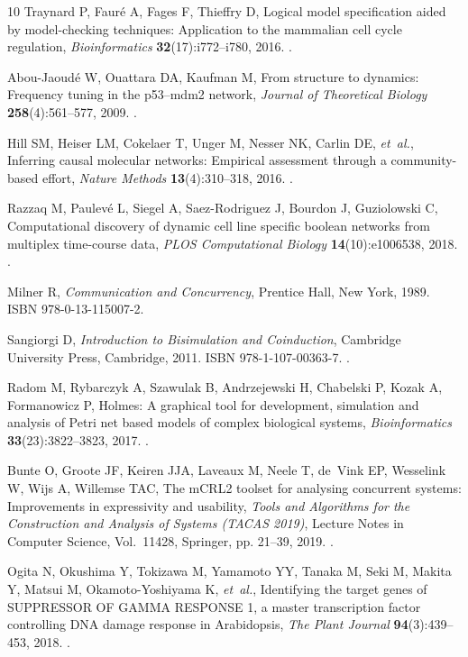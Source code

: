 \documentclass{ws-jbcb}
\numberwithin{equation}{section}
\begin{document}
\begin{thebibliography}{10}
Traynard P, Faur\'e A, Fages F, Thieffry D, Logical model specification aided
  by model-checking techniques: Application to the mammalian cell cycle
  regulation, \emph{Bioinformatics} \textbf{32}(17):i772--i780, 2016.
\newblock {}.

Abou-Jaoud\'e W, Ouattara DA, Kaufman M, From structure to dynamics: Frequency
  tuning in the p53--mdm2 network, \emph{Journal of Theoretical Biology}
  \textbf{258}(4):561--577, 2009.
\newblock {}.

Hill SM, Heiser LM, Cokelaer T, Unger M, Nesser NK, Carlin DE, \emph{et~al.},
  Inferring causal molecular networks: Empirical assessment through a
  community-based effort, \emph{Nature Methods} \textbf{13}(4):310--318, 2016.
\newblock {}.

Razzaq M, Paulev{\'e} L, Siegel A, Saez-Rodriguez J, Bourdon J, Guziolowski C,
  Computational discovery of dynamic cell line specific boolean networks from
  multiplex time-course data, \emph{PLOS Computational Biology}
  \textbf{14}(10):e1006538, 2018.
\newblock {}.

Milner R, \emph{Communication and Concurrency}, Prentice Hall, New York, 1989.
\newblock ISBN 978-0-13-115007-2.

Sangiorgi D, \emph{Introduction to Bisimulation and Coinduction}, Cambridge
  University Press, Cambridge, 2011.
\newblock ISBN 978-1-107-00363-7.
\newblock {}.

Radom M, Rybarczyk A, Szawulak B, Andrzejewski H, Chabelski P, Kozak A,
  Formanowicz P, Holmes: A graphical tool for development, simulation and
  analysis of {Petri} net based models of complex biological systems,
  \emph{Bioinformatics} \textbf{33}(23):3822--3823, 2017.
\newblock {}.

Bunte O, Groote JF, Keiren JJA, Laveaux M, Neele T, de~Vink EP, Wesselink W,
  Wijs A, Willemse TAC, The {mCRL2} toolset for analysing concurrent systems:
  Improvements in expressivity and usability,  \emph{Tools and Algorithms for
  the Construction and Analysis of Systems (TACAS 2019)}, Lecture Notes in
  Computer Science, Vol.~11428, Springer, pp. 21--39, 2019.
\newblock {}.

Ogita N, Okushima Y, Tokizawa M, Yamamoto YY, Tanaka M, Seki M, Makita Y,
  Matsui M, Okamoto-Yoshiyama K, \emph{et~al.}, Identifying the target genes of
  {SUPPRESSOR OF GAMMA RESPONSE 1}, a master transcription factor controlling
  {DNA} damage response in {Arabidopsis}, \emph{The Plant Journal}
  \textbf{94}(3):439--453, 2018.
\newblock {}.


\end{thebibliography}
\end{document}
